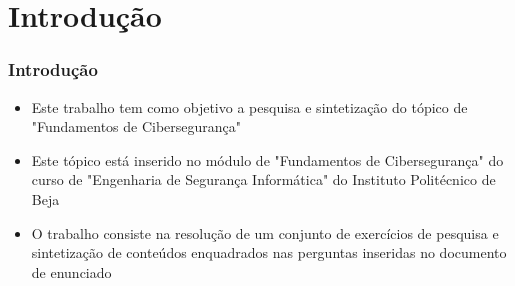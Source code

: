 \section{Introdução}
\begin{frame}
  \frametitle{Introdução}
  \begin{itemize}
    \item Este trabalho tem como objetivo a pesquisa e sintetização do tópico de "Fundamentos de Cibersegurança"
    \item Este tópico está inserido no módulo de "Fundamentos de Cibersegurança" do curso de "Engenharia de Segurança Informática" do Instituto Politécnico de Beja
    \item O trabalho consiste na resolução de um conjunto de exercícios de pesquisa e sintetização de conteúdos enquadrados nas perguntas inseridas no documento de enunciado
  \end{itemize}
\end{frame}
